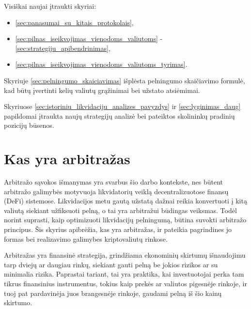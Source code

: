 \documentclass[]{VUMIFTemplateClass}
\begin{document}
Visiškai naujai įtraukti skyriai:
\begin{itemize}
\item \ref{sec:panasumai_su_kitais_protokolais},
\item \ref{sec:pilnas_iseikvojimas_vienodoms_valiutoms} - \ref{sec:strategiju_apibendrinimas},
\item \ref{sec:pilnas_iseikvojimas_vienodoms_valiutoms_tyrimas}.
\end{itemize}

Skyriuje \ref{sec:pelningumo_skaiciavimas} išplėsta pelningumo skaičiavimo formulė, kad būtų įvertinti kelių valiutų grąžinimai bei užstato atsiėmimai.

Skyriuose \ref{sec:istoriniu_likvidaciju_analizes_pavyzdys} ir \ref{sec:lyginimas_daug} papildomai įtraukta naujų strategijų analizė bei pateiktos skolininkų pradinių pozicijų būsenos.

\section{Kas yra arbitražas}

Arbitražo sąvokos išmanymas yra svarbus šio darbo kontekste, nes būtent arbitražo galimybės motyvuoja likvidatorių veiklą decentralizuotose finansų (DeFi) sistemose. Likvidacijos metu gautą užstatą dažnai reikia konvertuoti į kitą valiutą siekiant užfiksuoti pelną, o tai yra arbitražui būdingas veiksmas. Todėl norint suprasti, kaip optimizuoti likvidacijų pelningumą, būtina suvokti arbitražo principus. Šis skyrius apibrėžia, kas yra arbitražas, ir pateikia pagrindines jo formas bei realizavimo galimybes kriptovaliutų rinkose.

Arbitražas yra finansinė strategija, grindžiama ekonominių skirtumų išnaudojimu tarp dviejų ar daugiau rinkų, siekiant gauti pelną be jokios rizikos ar su minimalia rizika. Paprastai tariant, tai yra praktika, kai investuotojai perka tam tikrus finansinius instrumentus, tokius kaip prekės ar valiutos pigesnėje rinkoje, ir tuoj pat pardavinėja juos brangesnėje rinkoje, gaudami pelną iš šio kainų skirtumo.
\end{document}
